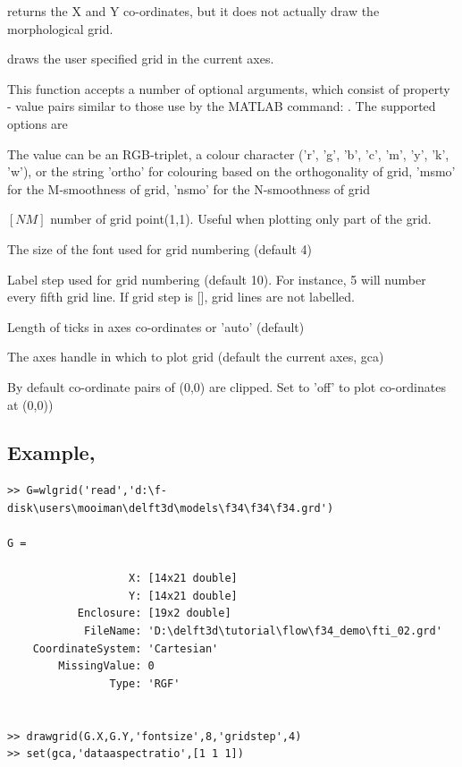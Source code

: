  returns the X and Y co-ordinates, but it does not actually draw the morphological grid.

 draws the user specified grid in the current axes.

This function accepts a number of optional arguments, which consist of property - value pairs similar to those use by the MATLAB  command:
.
The supported options are

\begin{guilist}
\item['color'] The value can be an RGB-triplet, a colour character ('r', 'g', 'b', 'c', 'm', 'y', 'k', 'w'), or the string 'ortho' for colouring based on the orthogonality of grid, 'msmo' for the M-smoothness of grid, 'nsmo' for the N-smoothness of grid
\item['m1n1'] $[N M]$ number of grid point(1,1).
Useful when plotting only part of the grid.
\item['fontsize'] The size of the font used for grid numbering (default 4)
\item['gridstep'] Label step used for grid numbering (default 10).
For instance, 5 will number every fifth grid line.
If grid step is [], grid lines are not labelled.
\item['thicklength'] Length of ticks in axes co-ordinates or 'auto' (default)
\item['parent'] The axes handle in which to plot grid (default the current axes, gca)
\item['clipzero'] By default co-ordinate pairs of (0,0) are clipped.
Set to 'off' to plot co-ordinates at (0,0))
\end{guilist}

\subsection*{Example, }
\begin{Verbatim}
>> G=wlgrid('read','d:\f-disk\users\mooiman\delft3d\models\f34\f34\f34.grd')

G =

                   X: [14x21 double]
                   Y: [14x21 double]
           Enclosure: [19x2 double]
            FileName: 'D:\delft3d\tutorial\flow\f34_demo\fti_02.grd'
    CoordinateSystem: 'Cartesian'
        MissingValue: 0
                Type: 'RGF'


>> drawgrid(G.X,G.Y,'fontsize',8,'gridstep',4)
>> set(gca,'dataaspectratio',[1 1 1])
\end{Verbatim}

